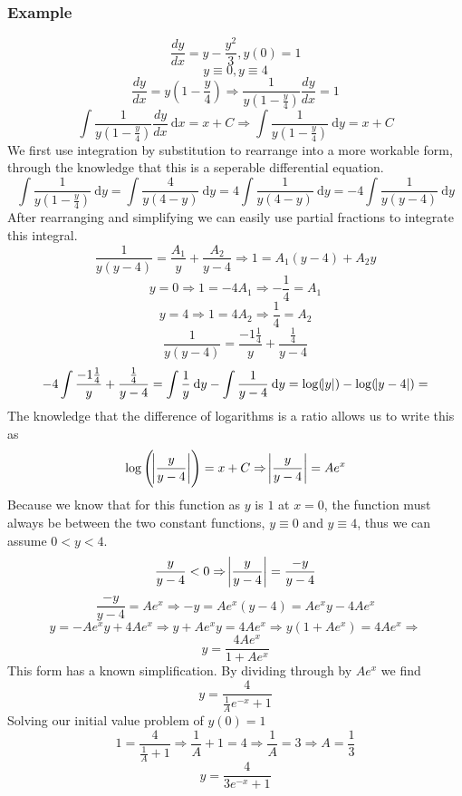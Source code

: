 \documentclass[12pt]{report}
\newcommand{\dx}{\:\mathrm{d}x}
\newcommand{\dy}{\:\mathrm{d}y}
\begin{document}
\begin{flushleft}
\subsubsection*{Example}
\[\frac{dy}{dx} = y - \frac{y^2}{3}, y(0) = 1\]
\[y \equiv 0, y \equiv 4\]
\[\frac{dy}{dx} = y(1 - \frac{y}{4}) 
\Rightarrow \frac{1}{y(1 - \frac{y}{4})}\frac{dy}{dx} = 1\]
\[\int \frac{1}{y(1 - \frac{y}{4})}\frac{dy}{dx}\dx = x + C 
\Rightarrow \int \frac{1}{y(1 - \frac{y}{4})}\dy = x + C\]
We first use integration by substitution to rearrange into a more workable
form, through the knowledge that this is a seperable differential equation.
\[\int \frac{1}{y(1 - \frac{y}{4})} \dy 
= \int \frac{4}{y(4 - y)} \dy
= 4\int \frac{1}{y(4 - y)} \dy
= -4\int \frac{1}{y(y - 4)} \dy\]
After rearranging and simplifying we can easily use partial fractions to
integrate this integral.
\[\frac{1}{y(y - 4)} = \frac{A_1}{y} + \frac{A_2}{y - 4} \Rightarrow
1 = A_1(y - 4) + A_2y\]
\[y = 0 \Rightarrow 1 = -4A_1 \Rightarrow -\frac{1}{4} = A_1\]
\[y = 4 \Rightarrow 1 = 4A_2 \Rightarrow \frac{1}{4} = A_2\]
\[\frac{1}{y(y - 4)} = \frac{-1\frac{1}{4}}{y} + \frac{\frac{1}{4}}{y - 4}\]
\[-4\int \frac{-1\frac{1}{4}}{y} + \frac{\frac{1}{4}}{y - 4} 
= \int \frac{1}{y} \dy - \int \frac{1}{y - 4} \dy 
= \log(\abs{y}) - \log(\abs{y - 4}) = \]
The knowledge that the difference of logarithms is a ratio allows us to write
this as
\[\log\left(\abs{\frac{y}{y - 4}}\right) = x + C 
\Rightarrow \abs{\frac{y}{y - 4}} = Ae^x\]
Because we know that for this function as \(y\) is \(1\) at \(x = 0\), the
function must always be between the two constant functions, \(y \equiv 0\) and
\(y \equiv 4\), thus we can assume \(0 < y < 4\).
\[\frac{y}{y - 4} < 0 \Rightarrow \abs{\frac{y}{y - 4}} = \frac{-y}{y - 4}\]
\[\frac{-y}{y - 4} = Ae^x \Rightarrow -y = Ae^x(y - 4) = Ae^xy - 4Ae^x\]
\[y = -Ae^xy + 4Ae^x \Rightarrow y + Ae^xy = 4Ae^x 
\Rightarrow y(1 + Ae^x) = 4Ae^x \Rightarrow\]
\[y = \frac{4Ae^x}{1 + Ae^x}\]
This form has a known simplification. By dividing through by \(Ae^x\) we find
\[y = \frac{4}{\frac{1}{A}e^{-x} + 1}\]
Solving our initial value problem of \(y(0) = 1\)
\[1 = \frac{4}{\frac{1}{A} + 1} \Rightarrow \frac{1}{A} + 1 = 4 
\Rightarrow \frac{1}{A} = 3 \Rightarrow A = \frac{1}{3}\]
\[y = \frac{4}{3e^{-x} + 1}\]

\end{flushleft}
\end{document}
